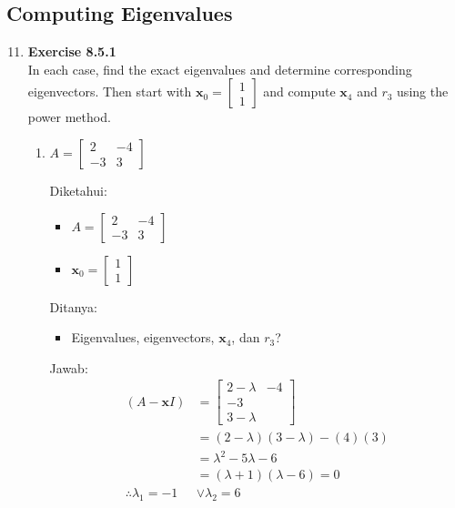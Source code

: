 \documentclass[12pt, a4paper]{scrartcl}
\begin{document}
    \subsection*{Computing Eigenvalues}
        \begin{enumerate}
            \setcounter{enumi}{10}
            \item \textbf{Exercise 8.5.1}\\In each case, find the exact eigenvalues and determine corresponding eigenvectors. Then start with $\textbf{x}_0=\begin{bmatrix}
                1\\1
            \end{bmatrix}$ and compute $\textbf{x}_4$ and $r_3$ using the power method.
            \begin{enumerate}
                \item $A=\begin{bmatrix}
                    2&-4\\-3&3
                \end{bmatrix}$

                Diketahui:
                \begin{itemize}
                    \item[] $A=\begin{bmatrix}
                        2&-4\\-3&3
                    \end{bmatrix}$
                    \item[] $\textbf{x}_0=\begin{bmatrix}
                        1\\1
                    \end{bmatrix}$
                \end{itemize}

                Ditanya:
                \begin{itemize}
                    \item Eigenvalues, eigenvectors, $\textbf{x}_4$, dan $r_3$?
                \end{itemize}

                Jawab:
                \begin{align*}
                    (A-\textbf{x}I) &= \begin{bmatrix}
                        2-\lambda&-4\\-3\\3-\lambda
                    \end{bmatrix}
                    \\ &=(2-\lambda)(3-\lambda)-(4)(3)
                    \\ &=\lambda^2-5\lambda-6
                    \\ &=(\lambda+1)(\lambda-6)=0
                    \\ \therefore \lambda_1=-1 &\lor \lambda_2=6 
                \end{align*}
                

\end{enumerate}
\end{enumerate}
\end{document}
